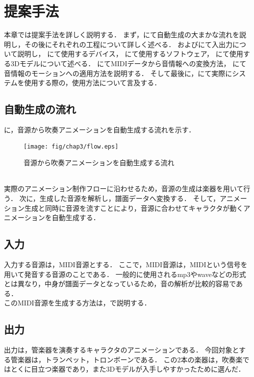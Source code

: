 \chapter{提案手法} \label{chap:algorithm}
本章では提案手法を詳しく説明する．
まず，にて自動生成の大まかな流れを説明し，その後にそれぞれの工程について詳しく述べる．
およびにて入出力について説明し，
にて使用するデバイス，
にて使用するソフトウェア，
にて使用する3Dモデルについて述べる．
にてMIDIデータから音情報への変換方法，
にて音情報のモーションへの適用方法を説明する．
そして最後に，にて実際にシステムを使用する際の，使用方法について言及する．

\section{自動生成の流れ} \label{sec:flow}
に，音源から吹奏アニメーションを自動生成する流れを示す．\\
\begin{figure}[!h]
	\centering
	\texttt{[image: fig/chap3/flow.eps]}
	\caption{音源から吹奏アニメーションを自動生成する流れ}
	\label{fig:flow}
\end{figure}
\\
\indent
実際のアニメーション制作フローに沿わせるため，音源の生成は楽器を用いて行う．
次に，生成した音源を解析し，譜面データへ変換する．
そして，アニメーション生成と同時に音源を流すことにより，音源に合わせてキャラクタが動くアニメーションを自動生成する．

\section{入力} \label{sec:input}
入力する音源は，MIDI音源とする．
ここで，MIDI音源は，MIDIという信号を用いて発音する音源のことである．
一般的に使用されるmp3やwaveなどの形式とは異なり，中身が譜面データとなっているため，音の解析が比較的容易である．\\
\indent
このMIDI音源を生成する方法は，で説明する．

\section{出力} \label{sec:output}
出力は，管楽器を演奏するキャラクタのアニメーションである．
今回対象とする管楽器は，トランペット，トロンボーンである．
この2本の楽器は，吹奏楽ではとくに目立つ楽器であり，また3Dモデルが入手しやすかったために選んだ．

